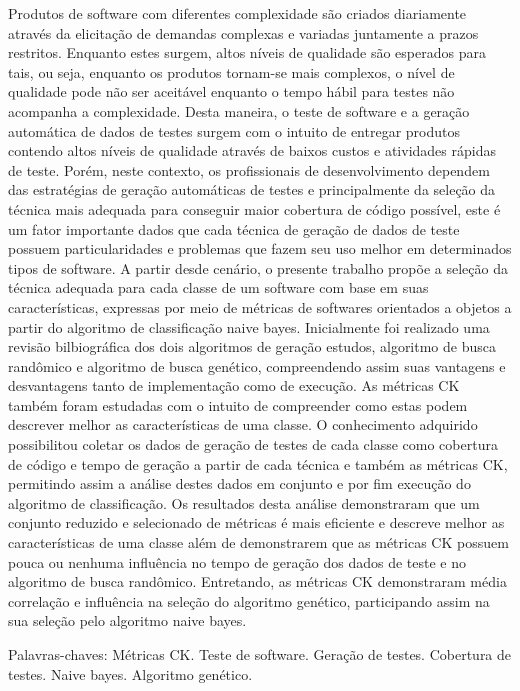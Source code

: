 \documentclass[
	12pt,				%
	oneside,			%
	a4paper,			%
	english,			%
	brazil				%
	]{abntex2ppgsi}
\begin{document}
\begin{resumo}
Produtos de software com diferentes complexidade são criados diariamente através da elicitação de demandas complexas e variadas juntamente a prazos restritos. Enquanto estes surgem, altos níveis de qualidade são esperados para tais, ou seja, enquanto os produtos tornam-se mais complexos, o nível de qualidade pode não ser aceitável enquanto o tempo hábil para testes não acompanha a complexidade. Desta maneira, o teste de software e a geração automática de dados de testes surgem com o intuito de entregar produtos contendo altos níveis de qualidade através de baixos custos e atividades rápidas de teste. Porém, neste contexto, os profissionais de desenvolvimento dependem das estratégias de geração automáticas de testes e principalmente da seleção da técnica mais adequada para conseguir maior cobertura de código possível, este é um fator importante dados que cada técnica de geração de dados de teste possuem particularidades e problemas que fazem seu uso melhor em determinados tipos de software. A partir desde cenário, o presente trabalho propõe a seleção da técnica adequada para cada classe de um software com base em suas características, expressas por meio de métricas de softwares orientados a objetos a partir do algoritmo de classificação naive bayes.
Inicialmente foi realizado uma revisão bilbiográfica dos dois algoritmos de geração estudos, algoritmo de busca randômico e algoritmo de busca genético, compreendendo assim suas vantagens e desvantagens tanto de implementação como de execução. As métricas CK também foram estudadas com o intuito de compreender como estas podem descrever melhor as características de uma classe. O conhecimento adquirido possibilitou coletar os dados de geração de testes de cada classe como cobertura de código e tempo de geração a partir de cada técnica e também as métricas CK, permitindo assim a análise destes dados em conjunto e por fim execução do algoritmo de classificação. Os resultados desta análise demonstraram que um conjunto reduzido e selecionado de métricas é mais eficiente e descreve melhor as características de uma classe além de demonstrarem que as métricas CK possuem pouca ou nenhuma influência no tempo de geração dos dados de teste e no algoritmo de busca randômico. Entretando, as métricas CK demonstraram média correlação e influência na seleção do algoritmo genético, participando assim na sua seleção pelo algoritmo naive bayes.


Palavras-chaves: Métricas CK. Teste de software. Geração de testes. Cobertura de testes. Naive bayes. Algoritmo genético. 
\end{resumo}
\end{document}
